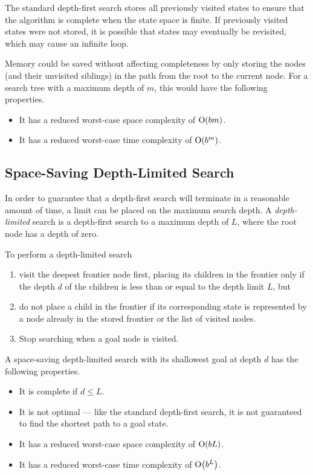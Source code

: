 The standard depth-first search stores all previously visited states to ensure that the algorithm is complete when the state space is finite.
If previously visited states were not stored, it is possible that states may eventually be revisited, which may cause an infinite loop.

Memory could be saved without affecting completeness by only storing the nodes (and their unvisited siblings) in the path from the root to the current node.
For a search tree with a maximum depth of \( m \), this would have the following properties.
\begin{itemize}
  \item It has a reduced worst-case space complexity of \( \mathrm{O}\!\left( b m \right) \).
  \item It has a reduced worst-case time complexity of \( \mathrm{O}\!\left( b^{m} \right) \).
\end{itemize}

\subsection{Space-Saving Depth-Limited Search}

In order to guarantee that a depth-first search will terminate in a reasonable amount of time, a limit can be placed on the maximum search depth.
A \emph{depth-limited} search is a depth-first search to a maximum depth of \( L \), where the root node has a depth of zero.

To perform a depth-limited search
\begin{enumerate}
  \item visit the deepest frontier node first, placing its children in the frontier only if the depth \( d \) of the children is less than or equal to the depth limit \( L \), but
  \item do not place a child in the frontier if its corresponding state is represented by a node already in the stored frontier or the list of visited nodes.
  \item Stop searching when a goal node is visited.
\end{enumerate}

A space-saving depth-limited search with its shallowest goal at depth \( d \) has the following properties.
\begin{itemize}
  \item It is complete if \( d \leq L \).
  \item It is not optimal --- like the standard depth-first search, it is not guaranteed to find the shortest path to a goal state.
  \item It has a reduced worst-case space complexity of \( \mathrm{O}\!\left( b L \right) \).
  \item It has a reduced worst-case time complexity of \( \mathrm{O}\!\left( b^{L} \right) \).
\end{itemize}

